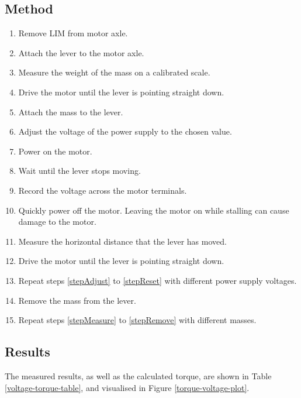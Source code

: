 \subsection{Method}

\begin{enumerate}
	\item Remove LIM from motor axle.
	\item Attach the lever to the motor axle.
	\item Measure the weight of the mass on a calibrated scale. \label{stepMeasure}
	\item Drive the motor until the lever is pointing straight down.
	\item Attach the mass to the lever.
	\item Adjust the voltage of the power supply to the chosen value. \label{stepAdjust}
	\item Power on the motor.
	\item Wait until the lever stops moving.
	\item Record the voltage across the motor terminals. 
	\item Quickly power off the motor. Leaving the motor on while stalling can cause damage to the motor.
	\item Measure the horizontal distance that the lever has moved.
	\item Drive the motor until the lever is pointing straight down. \label{stepReset}
	\item Repeat steps \ref{stepAdjust} to \ref{stepReset} with different power supply voltages.
	\item Remove the mass from the lever. \label{stepRemove}
	\item Repeat steps \ref{stepMeasure} to \ref{stepRemove} with different masses.
\end{enumerate}
\subsection{Results}
The measured results, as well as the calculated torque, are shown in Table \ref{voltage-torque-table}, and visualised in Figure \ref{torque-voltage-plot}.

